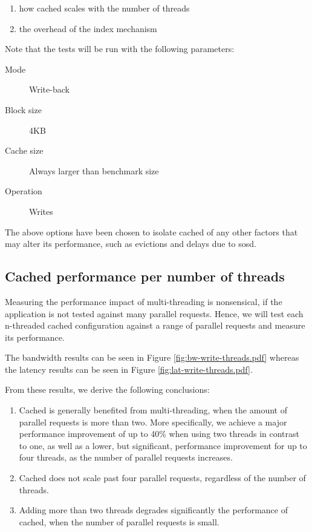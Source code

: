 \begin{enumerate}
	\item how cached scales with the number of threads
	\item the overhead of the index mechanism
\end{enumerate}

Note that the tests will be run with the following parameters:

\begin{description}
	\item[Mode] Write-back
	\item[Block size] 4KB
	\item[Cache size] Always larger than benchmark size
	\item[Operation] Writes
\end{description}

The above options have been chosen to isolate cached of any other factors that 
may alter its performance, such as evictions and delays due to sosd.

\subsection{Cached performance per number of threads}

Measuring the performance impact of multi-threading is nonsensical, if the 
application is not tested against many parallel requests. Hence, we will test 
each n-threaded cached configuration against a range of parallel requests and 
measure its performance.

The bandwidth results can be seen in Figure \ref{fig:bw-write-threads.pdf} 
whereas the latency results can be seen in Figure 
\ref{fig:lat-write-threads.pdf}.


From these results, we derive the following conclusions:

\begin{enumerate}
	\item Cached is generally benefited from multi-threading, when the amount 
		of parallel requests is more than two. More specifically, we 
		achieve a major performance improvement of up to 40\% when 
		using two threads in contrast to one, as well as a lower, but 
		significant, performance improvement for up to four threads, as 
		the number of parallel requests increases.
	\item Cached does not scale past four parallel requests, regardless of 
		the number of threads.
	\item Adding more than two threads degrades significantly the performance 
		of cached, when the number of parallel requests is small.
\end{enumerate}

